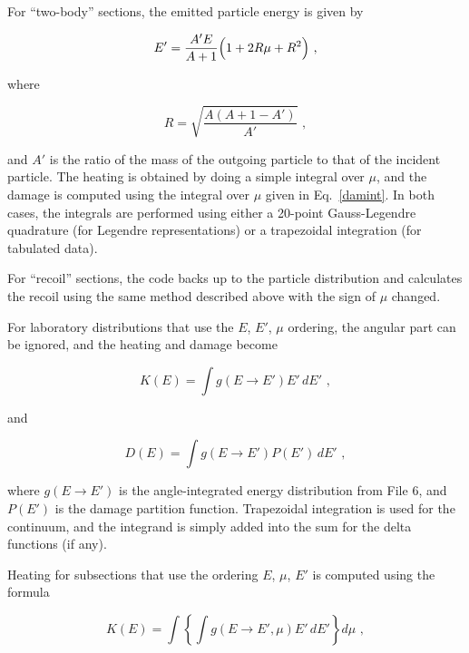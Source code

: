 For ``two-body'' sections,  the emitted particle energy is given by

\begin{equation}
   E'=\frac{A'E}{A+1}\Bigl(1+2R\mu+R^2\Bigr) \,\,,
\label{ebar6}
\end{equation}
\vspace{1 pt}

\noindent
where

\begin{equation}
   R=\sqrt{\frac{A(A+1-A')}{A'}} \,\,,
\label{beta}
\end{equation}

\noindent
and $A'$ is the ratio of the mass of the outgoing particle to
that of the incident particle.  The heating is obtained by doing
a simple integral over $\mu$, and the damage is computed using
the integral over $\mu$ given in Eq.~\ref{damint}.  In both
cases, the integrals are performed using either a 20-point
Gauss-Legendre quadrature
(for Legendre representations) or a trapezoidal integration
(for tabulated data).

For ``recoil'' sections, the code backs up to the particle
distribution and calculates the recoil using  the same method
described above with the sign of $\mu$ changed.

For laboratory distributions that use the $E$, $E'$, $\mu$
ordering, the angular part can be ignored, and the heating and
damage become

\begin{equation}
   K(E)=\int g(E{\rightarrow}E')E'\,dE'\,\,,
\label{KofE}
\end{equation}

\noindent
and

\begin{equation}
   D(E)=\int g(E{\rightarrow}E')P(E')\,dE'\,\,,
\label{DofE}
\end{equation}

\noindent
where $g(E{\rightarrow}E')$ is the angle-integrated energy
distribution from File 6, and $P(E')$ is the damage partition
function.  Trapezoidal integration is used for the continuum,
and the integrand is simply added into the sum for the
delta functions (if any).

Heating for subsections that use the ordering $E$, $\mu$, $E'$
is computed using the formula

\begin{equation}
   K(E)=\int \left\{ \int g(E{\rightarrow}E',\mu)
     E'\,dE'\right\} d\mu\,\,,
\label{llnl}
\end{equation}

